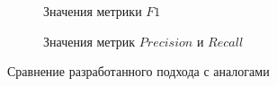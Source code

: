 \begin{figure}[h]
\centering
\begin{subfigure}{.5\textwidth}
  \centering
  \caption{Значения метрики $F1$}
  \label{plot_f1}
\end{subfigure}%
\begin{subfigure}{.5\textwidth}
  \centering
  \caption{Значения метрик $Precision$ и $Recall$}
  \label{plot_pr}
\end{subfigure}
\caption{Сравнение разработанного подхода с аналогами}
\label{plot}
\end{figure}

